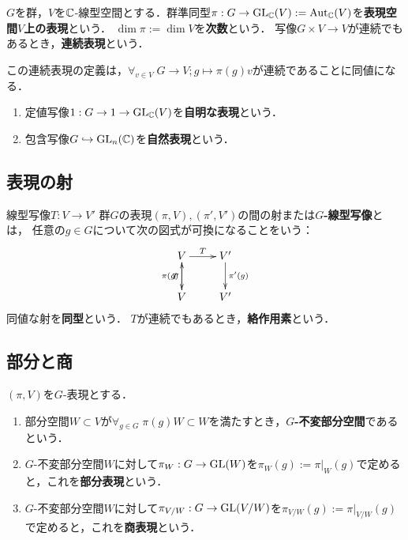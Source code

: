 \documentclass[uplatex,dvipdfmx]{jsreport}
\begin{document}
\begin{definition}[representation]
    $G$を群，$V$を$\mathbb{C}$-線型空間とする．群準同型$\pi:G\to\mathrm{GL}_{\mathbb{C}}(V):=\mathrm{Aut}_{\mathbb{C}}(V)$を\textbf{表現空間$V$上の表現}という．
    $\dim\pi:=\dim V$を\textbf{次数}という．
    写像$G\times V\to V$が連続でもあるとき，\textbf{連続表現}という．
\end{definition}
\begin{remarks}
    この連続表現の定義は，$\forall_{v\in V}\;G\to V;g\mapsto \pi(g)v$が連続であることに同値になる．
\end{remarks}

\begin{example}\mbox{}
    \begin{enumerate}
        \item 定値写像$1:G\to1\to\mathrm{GL}_{\mathbb{C}}(V)$を\textbf{自明な表現}という．
        \item 包含写像$G\hookrightarrow\mathrm{GL}_n(\mathbb{C})$を\textbf{自然表現}という．
    \end{enumerate}
\end{example}

\subsection{表現の射}

\begin{definition}
    線型写像$T:V\to V'$
    群$G$の表現$(\pi,V),(\pi',V')$の間の射または\textbf{$G$-線型写像}とは，
    任意の$g\in G$について次の図式が可換になることをいう：
    \[\xymatrix{
        V\ar[r]^-T\ar[d]_-{\pi(g)}&V'\ar[d]^-{\pi'(g)}\\
        V\ar[u]^-T&V'
    }\]
    同値な射を\textbf{同型}という．
    $T$が連続でもあるとき，\textbf{絡作用素}という．
\end{definition}

\subsection{部分と商}

\begin{definition}
    $(\pi,V)$を$G$-表現とする．
    \begin{enumerate}
        \item 部分空間$W\subset V$が$\forall_{g\in G}\;\pi(g)W\subset W$を満たすとき，\textbf{$G$-不変部分空間}であるという．
        \item $G$-不変部分空間$W$に対して$\pi_W:G\to\mathrm{GL}(W)$を$\pi_W(g):=\pi|_W(g)$で定めると，これを\textbf{部分表現}という．
        \item $G$-不変部分空間$W$に対して$\pi_{V/W}:G\to\mathrm{GL}(V/W)$を$\pi_{V/W}(g):=\pi|_{V/W}(g)$で定めると，これを\textbf{商表現}という．
    \end{enumerate}
\end{definition}
\end{document}
